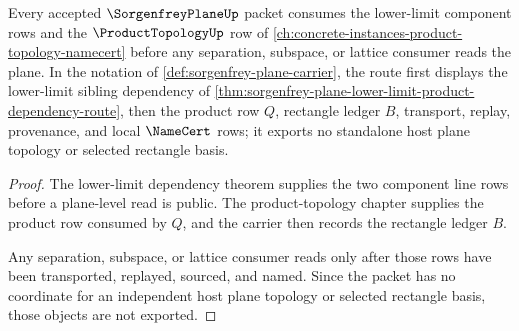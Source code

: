 \begin{proposition}
\label{prop:sorgenfrey-plane-product-topology-dependency}
Every accepted $\SorgenfreyPlaneUp$ packet consumes the lower-limit component rows and the $\ProductTopologyUp$ row of \autoref{ch:concrete-instances-product-topology-namecert} before any separation, subspace, or lattice consumer reads the plane. In the notation of \autoref{def:sorgenfrey-plane-carrier}, the route first displays the lower-limit sibling dependency of \autoref{thm:sorgenfrey-plane-lower-limit-product-dependency-route}, then the product row $Q$, rectangle ledger $B$, transport, replay, provenance, and local $\NameCert$ rows; it exports no standalone host plane topology or selected rectangle basis.
\end{proposition}
\begin{proof}
The lower-limit dependency theorem supplies the two component line rows before a plane-level read is public. The product-topology chapter supplies the product row consumed by $Q$, and the carrier then records the rectangle ledger $B$.

Any separation, subspace, or lattice consumer reads only after those rows have been transported, replayed, sourced, and named. Since the packet has no coordinate for an independent host plane topology or selected rectangle basis, those objects are not exported.
\end{proof}
